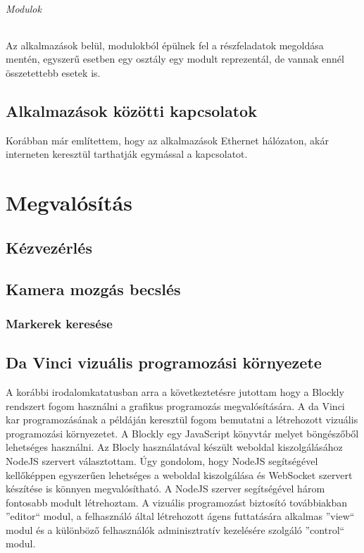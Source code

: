 \documentclass[12pt,a4paper,oneside]{report} %
\begin{document}
\subparagraph{Modulok}
Az alkalmazások belül, modulokból épülnek fel a részfeladatok megoldása mentén, egyszerű esetben egy osztály egy modult reprezentál, de vannak ennél összetettebb esetek is. 


\section{Alkalmazások közötti kapcsolatok}
Korábban már említettem, hogy az alkalmazások Ethernet hálózaton, akár interneten keresztül tarthatják egymással a kapcsolatot. 


\begin{figure}[H]
\end{figure}
\chapter{Megvalósítás}
\section{Kézvezérlés}
\label{kezvez}
\section{Kamera mozgás becslés}
\subsection{Markerek keresése}

\section{Da Vinci vizuális programozási környezete}
A korábbi irodalomkatatusban arra a következtetésre jutottam hogy a Blockly rendszert fogom használni a  grafikus programozás megvalósítására.
A da Vinci kar programozásának a példáján keresztül fogom bemutatni a létrehozott vizuális programozási környezetet.
A Blockly egy JavaScript könyvtár melyet böngészőből lehetséges használni. Az Blocly használatával készült weboldal kiszolgálásához NodeJS szervert választottam. Úgy gondolom, hogy NodeJS segítségével kellőképpen egyszerűen lehetséges a weboldal kiszolgálása és WebSocket szervert készítése is könnyen megvalósítható. A NodeJS szerver segítségével három fontosabb modult létrehoztam. A vizuális programozást biztosító továbbiakban ''editor`` modul, a felhasználó által létrehozott ágens futtatására alkalmas ''view`` modul és a különböző felhasználók adminisztratív kezelésére szolgáló ''control`` modul.
\end{document}
